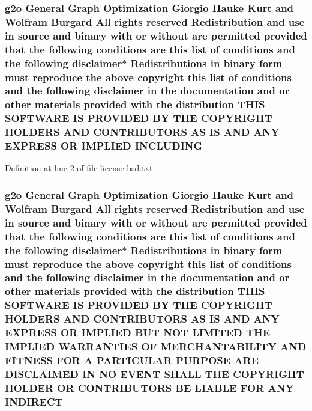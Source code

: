 \subsubsection[{\texorpdfstring{I\+N\+C\+L\+U\+D\+I\+NG}{INCLUDING}}]{\setlength{\rightskip}{0pt plus 5cm}g2o General Graph Optimization Giorgio Hauke Kurt and Wolfram Burgard All rights reserved Redistribution and use in source and binary with or without are permitted provided that the following conditions are this list of conditions and the following disclaimer$\ast$ Redistributions in binary form must reproduce the above copyright this list of conditions and the following disclaimer in the documentation and or other materials provided with the distribution T\+H\+IS S\+O\+F\+T\+W\+A\+RE IS P\+R\+O\+V\+I\+D\+ED BY T\+HE C\+O\+P\+Y\+R\+I\+G\+HT H\+O\+L\+D\+E\+RS A\+ND C\+O\+N\+T\+R\+I\+B\+U\+T\+O\+RS AS IS A\+ND A\+NY E\+X\+P\+R\+E\+SS OR I\+M\+P\+L\+I\+ED I\+N\+C\+L\+U\+D\+I\+NG}\hypertarget{license-bsd_8txt_aad5ea521b66beb52ecca7b476bdbf706}{}\label{license-bsd_8txt_aad5ea521b66beb52ecca7b476bdbf706}


Definition at line 2 of file license-\/bsd.\+txt.

\subsubsection[{\texorpdfstring{I\+N\+D\+I\+R\+E\+CT}{INDIRECT}}]{\setlength{\rightskip}{0pt plus 5cm}g2o General Graph Optimization Giorgio Hauke Kurt and Wolfram Burgard All rights reserved Redistribution and use in source and binary with or without are permitted provided that the following conditions are this list of conditions and the following disclaimer$\ast$ Redistributions in binary form must reproduce the above copyright this list of conditions and the following disclaimer in the documentation and or other materials provided with the distribution T\+H\+IS S\+O\+F\+T\+W\+A\+RE IS P\+R\+O\+V\+I\+D\+ED BY T\+HE C\+O\+P\+Y\+R\+I\+G\+HT H\+O\+L\+D\+E\+RS A\+ND C\+O\+N\+T\+R\+I\+B\+U\+T\+O\+RS AS IS A\+ND A\+NY E\+X\+P\+R\+E\+SS OR I\+M\+P\+L\+I\+ED B\+UT N\+OT L\+I\+M\+I\+T\+ED T\+HE I\+M\+P\+L\+I\+ED {\bf W\+A\+R\+R\+A\+N\+T\+I\+ES} OF M\+E\+R\+C\+H\+A\+N\+T\+A\+B\+I\+L\+I\+TY A\+ND F\+I\+T\+N\+E\+SS F\+OR A P\+A\+R\+T\+I\+C\+U\+L\+AR P\+U\+R\+P\+O\+SE A\+RE D\+I\+S\+C\+L\+A\+I\+M\+ED IN NO E\+V\+E\+NT S\+H\+A\+LL T\+HE C\+O\+P\+Y\+R\+I\+G\+HT H\+O\+L\+D\+ER OR C\+O\+N\+T\+R\+I\+B\+U\+T\+O\+RS BE L\+I\+A\+B\+LE F\+OR A\+NY I\+N\+D\+I\+R\+E\+CT}\hypertarget{license-bsd_8txt_a2e3fc6f58f82d01c0e8de42d17c7a7df}{}\label{license-bsd_8txt_a2e3fc6f58f82d01c0e8de42d17c7a7df}


